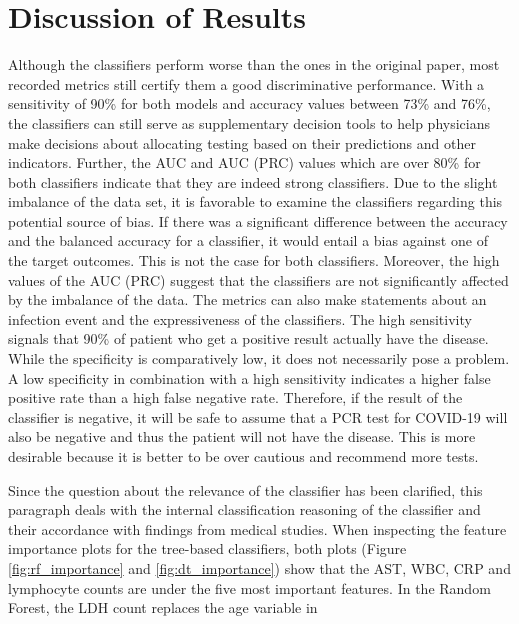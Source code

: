 \section{Discussion of Results}
Although the classifiers perform worse than the ones in the original paper, 
most recorded metrics still certify them a good discriminative performance.
With a sensitivity of 90\% for both models and accuracy values between 73\% and 
76\%, the classifiers can still serve as supplementary decision tools to help 
physicians make decisions about allocating testing based on their predictions 
and other indicators. Further, the AUC and AUC (PRC) values which are over 80\% 
for both classifiers indicate that they are indeed strong classifiers.
Due to the slight imbalance of the data set, it is  favorable to examine the 
classifiers regarding this potential source of bias. If there was a significant 
difference between the accuracy and the balanced accuracy for a classifier, it 
would entail a bias against one of the target outcomes. This is not the case 
for both classifiers. Moreover, the high values of the AUC (PRC) suggest that 
the classifiers are not significantly affected by the imbalance of the data.
The metrics can also make statements about an infection event and the 
expressiveness of the classifiers. The high sensitivity signals that 90\% of 
patient who get a positive result actually have the disease. While the 
specificity is comparatively low, it does not necessarily pose a problem. A low 
specificity in combination with a high sensitivity indicates a higher false 
positive rate than a high false negative rate.\cite{RN168}
Therefore, if the result of the classifier is negative, it will be safe to 
assume that a PCR test for COVID-19 will also be negative and thus the patient 
will not have the disease.
This is more desirable because it is better to be over cautious and recommend 
more tests.
\par
Since the question about the relevance of the classifier has been clarified, 
this paragraph deals with the internal classification reasoning of the 
classifier and their accordance with findings from medical studies.
When inspecting the feature importance plots for the tree-based classifiers, 
both plots (Figure \ref{fig:rf_importance} and \ref{fig:dt_importance}) show 
that the AST, WBC, CRP and lymphocyte counts are under the five most important 
features.
In the Random Forest, the LDH count replaces the age variable in 
